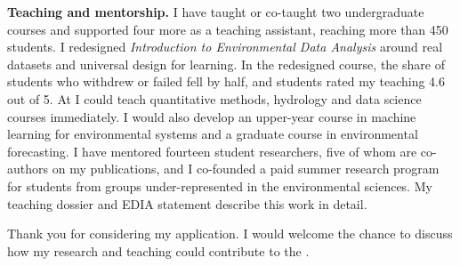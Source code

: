 \begin{coverletter}
\textbf{Teaching and mentorship.} I have taught or co-taught two
undergraduate courses and supported four more as a teaching assistant,
reaching more than 450 students. I redesigned \emph{Introduction to
Environmental Data Analysis} around real datasets and universal design for
learning. In the redesigned course, the share of students who withdrew or
failed fell by half, and students rated my teaching 4.6 out of 5. At
\Institution I could teach quantitative methods, hydrology and data science
courses immediately. I would also develop an upper-year course in machine
learning for environmental systems and a graduate course in environmental
forecasting. I have mentored fourteen student researchers, five of whom are
co-authors on my publications, and I co-founded a paid summer research
program for students from groups under-represented in the environmental
sciences. My teaching dossier and EDIA statement describe this work in
detail.

Thank you for considering my application. I would welcome the chance to
discuss how my research and teaching could contribute to the \Department.

\end{coverletter}
